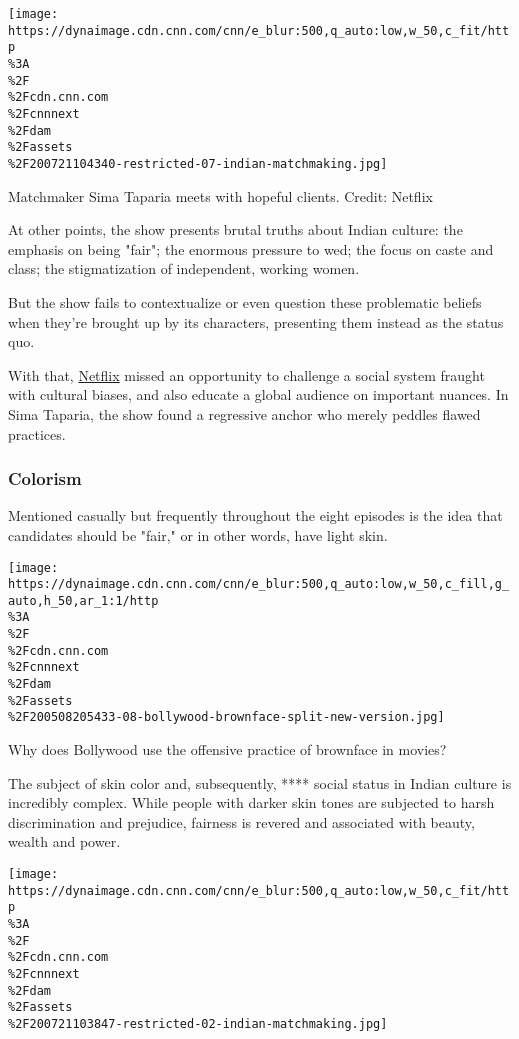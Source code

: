 \texttt{[image: https://dynaimage.cdn.cnn.com/cnn/e\_blur:500,q\_auto:low,w\_50,c\_fit/http\\\%3A\\\%2F\\\%2Fcdn.cnn.com\\\%2Fcnnnext\\\%2Fdam\\\%2Fassets\\\%2F200721104340-restricted-07-indian-matchmaking.jpg]}

Matchmaker Sima Taparia meets with hopeful clients. Credit: Netflix

At other points, the show presents brutal truths about Indian culture:
the emphasis on being "fair"; the enormous pressure to wed; the focus on
caste and class; the stigmatization of independent, working women.

But the show fails to contextualize or even question these problematic
beliefs when they're brought up by its characters, presenting them
instead as the status quo.

With that,
\href{https://edition.cnn.com/2020/07/20/entertainment/indian-matchmaking-netflix/index.html}{Netflix}
missed an opportunity to challenge a social system fraught with cultural
biases, and also educate a global audience on important nuances. In Sima
Taparia, the show found a regressive anchor who merely peddles flawed
practices.

\hypertarget{colorism}{%
\subsubsection{Colorism}\label{colorism}}

Mentioned casually but frequently throughout the eight episodes is the
idea that candidates should be "fair," or in other words, have light
skin.

\href{/style/article/india-bollywood-brownface-hnk-intl/index.html}{}

\texttt{[image: https://dynaimage.cdn.cnn.com/cnn/e\_blur:500,q\_auto:low,w\_50,c\_fill,g\_auto,h\_50,ar\_1:1/http\\\%3A\\\%2F\\\%2Fcdn.cnn.com\\\%2Fcnnnext\\\%2Fdam\\\%2Fassets\\\%2F200508205433-08-bollywood-brownface-split-new-version.jpg]}

Why does Bollywood use the offensive practice of brownface in movies?

The subject of skin color and, subsequently, **** social status in
Indian culture is incredibly complex. While people with darker skin
tones are subjected to harsh discrimination and prejudice, fairness is
revered and associated with beauty, wealth and power.

\texttt{[image: https://dynaimage.cdn.cnn.com/cnn/e\_blur:500,q\_auto:low,w\_50,c\_fit/http\\\%3A\\\%2F\\\%2Fcdn.cnn.com\\\%2Fcnnnext\\\%2Fdam\\\%2Fassets\\\%2F200721103847-restricted-02-indian-matchmaking.jpg]}

